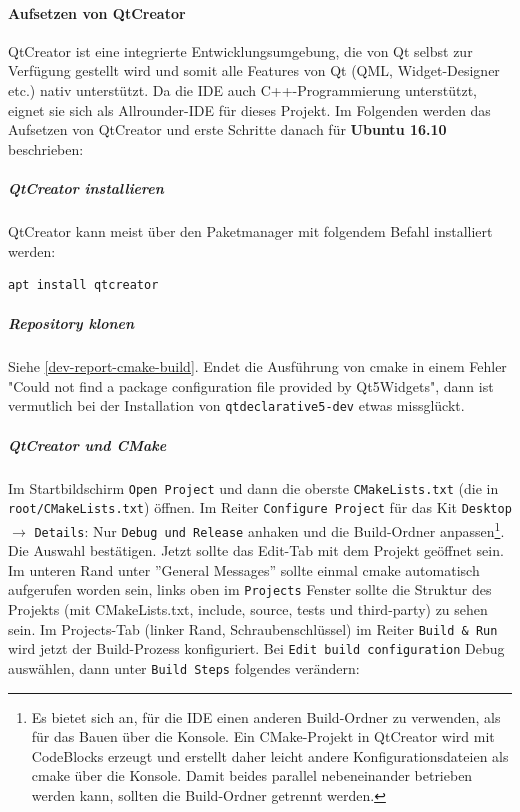 
\paragraph{Aufsetzen von QtCreator}

QtCreator ist eine integrierte Entwicklungsumgebung, die von Qt selbst zur
Verfügung gestellt wird und somit alle Features von Qt (QML, Widget-Designer
etc.) nativ unterstützt. Da die IDE auch C++-Programmierung unterstützt, eignet
sie sich als Allrounder-IDE für dieses Projekt. Im Folgenden werden das
Aufsetzen von QtCreator und erste Schritte danach für \textbf{Ubuntu 16.10}
beschrieben:

\subparagraph{QtCreator installieren}

QtCreator kann meist über den Paketmanager mit folgendem Befahl installiert werden: 
\begin{lstlisting}
apt install qtcreator
\end{lstlisting}

\subparagraph{Repository klonen}

Siehe \autoref{dev-report-cmake-build}. Endet die Ausführung von cmake in einem
Fehler "Could not find a package configuration file provided by Qt5Widgets",
dann ist vermutlich bei der Installation von \texttt{qtdeclarative5-dev} etwas
missglückt.

\subparagraph{QtCreator und CMake}

Im Startbildschirm \texttt{Open Project} und dann die oberste
\texttt{CMakeLists.txt} (die in \texttt{root/CMakeLists.txt}) öffnen. Im Reiter
\texttt{Configure Project} für das Kit \texttt{Desktop} $\rightarrow$
\texttt{Details}: Nur \texttt{Debug und Release} anhaken und die Build-Ordner
anpassen\footnote{Es bietet sich an, für die IDE einen anderen Build-Ordner zu
verwenden, als für das Bauen über die Konsole. Ein CMake-Projekt in QtCreator
wird mit CodeBlocks erzeugt und erstellt daher leicht andere
Konfigurationsdateien als cmake über die Konsole. Damit beides parallel
nebeneinander betrieben werden kann, sollten die Build-Ordner getrennt werden.}.
Die Auswahl bestätigen. Jetzt sollte das Edit-Tab mit dem Projekt geöffnet sein.
Im unteren Rand unter ''General Messages'' sollte einmal cmake automatisch
aufgerufen worden sein, links oben im \texttt{Projects} Fenster sollte die
Struktur des Projekts (mit CMakeLists.txt, include, source, tests und
third-party) zu sehen sein. Im Projects-Tab (linker Rand, Schraubenschlüssel) im
Reiter \texttt{Build \& Run} wird jetzt der Build-Prozess konfiguriert. Bei
\texttt{Edit build configuration} Debug auswählen, dann unter \texttt{Build
Steps} folgendes verändern:

